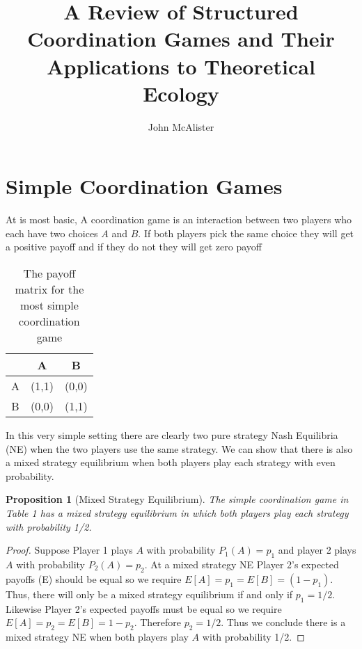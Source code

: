 \documentclass[]{article}
\title{A Review of Structured Coordination Games and Their Applications to Theoretical Ecology}
\author{John McAlister}
\newtheorem{proposition}[theorem]{Proposition}
\begin{document}
\maketitle

\begin{abstract}

\end{abstract}

\section{Simple Coordination Games}
	At is most basic, A coordination game is an interaction between two players who each have two choices $A$ and $B$. If both players pick the same choice they will get a positive payoff and if they do not they will get zero payoff \cite{Russell1999, Weibull1995}
	\begin{table}[h]\centering
		\begin{tabular}{c|cc}
			& A&B\\
			\hline
			A&(1,1)&(0,0)\\
			B&(0,0)&(1,1)
		\end{tabular}
	\caption{The payoff matrix for the most simple coordination game}
	\end{table}
	
	In this very simple setting there are clearly two pure strategy Nash Equilibria (NE) when the two players use the same strategy. We can show that there is also a mixed strategy equilibrium when both players play each strategy with even probability. 
	
	\begin{proposition}[Mixed Strategy Equilibrium]
		The simple coordination game in Table 1 has a mixed strategy equilibrium in which both players play each strategy with probability 1/2.
	\end{proposition}
	\begin{proof}
		Suppose Player 1 plays $A$ with probability $P_1(A)=p_1$ and player 2 plays $A$ with probability $P_2(A)=p_2$. At a mixed strategy NE Player 2's expected payoffs (E) should be equal so we require $E[A]=p_1=E[B]=(1-p_1)$. Thus, there will only be a mixed strategy equilibrium if and only if $p_1=1/2$. Likewise Player 2's expected payoffs must be equal so we require $E[A]=p_2=E[B]=1-p_2$. Therefore $p_2=1/2$. Thus we conclude there is a mixed strategy NE when both players play $A$ with probability 1/2.  
	\end{proof}
	
\end{document}
